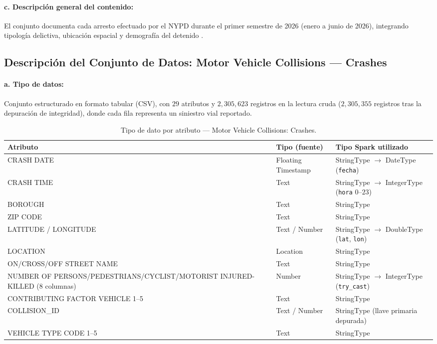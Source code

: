 \paragraph{c. Descripción general del contenido:} El conjunto documenta cada arresto efectuado por el NYPD durante el primer semestre de 2026 (enero a junio de 2026), integrando tipología delictiva, ubicación espacial y demografía del detenido \cite{nypd_arrests_ytd_2026}.

\subsection{Descripción del Conjunto de Datos: Motor Vehicle Collisions --- Crashes}
\label{subsec:desc_collisions}

\paragraph{a. Tipo de datos:} Conjunto estructurado en formato tabular (CSV), con $29$ atributos y $2,305,623$ registros en la lectura cruda ($2,305,355$ registros tras la depuración de integridad), donde cada fila representa un siniestro vial reportado.

\begin{table}[H]
\centering
\small
\caption{Tipo de dato por atributo --- Motor Vehicle Collisions: Crashes.}
\label{tab:tipos_collisions}
\begin{tabularx}{\linewidth}{X l l}
\toprule
\textbf{Atributo} & \textbf{Tipo (fuente)} & \textbf{Tipo Spark utilizado} \\
\midrule
CRASH DATE & Floating Timestamp & StringType $\rightarrow$ DateType (\texttt{fecha}) \\
CRASH TIME & Text & StringType $\rightarrow$ IntegerType (\texttt{hora} $0\text{--}23$) \\
BOROUGH & Text & StringType \\
ZIP CODE & Text & StringType \\
LATITUDE / LONGITUDE & Text / Number & StringType $\rightarrow$ DoubleType (\texttt{lat}, \texttt{lon}) \\
LOCATION & Location & StringType \\
ON/CROSS/OFF STREET NAME & Text & StringType \\
NUMBER OF PERSONS/PEDESTRIANS/CYCLIST/MOTORIST INJURED-KILLED (8 columnas) & Number & StringType $\rightarrow$ IntegerType (\texttt{try\_cast}) \\
CONTRIBUTING FACTOR VEHICLE 1--5 & Text & StringType \\
COLLISION\_ID & Text / Number & StringType (llave primaria depurada) \\
VEHICLE TYPE CODE 1--5 & Text & StringType \\
\bottomrule
\end{tabularx}
\end{table}

